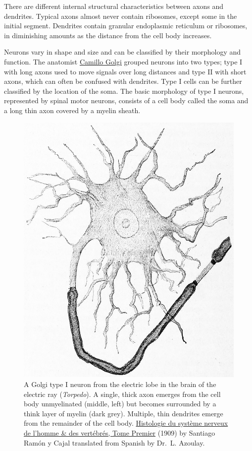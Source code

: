 There are different internal structural characteristics between axons and dendrites. Typical axons almost never contain ribosomes, except some in the initial segment. Dendrites contain granular endoplasmic reticulum or ribosomes, in diminishing amounts as the distance from the cell body increases.

Neurons vary in shape and size and can be classified by their morphology and function. The anatomist \href{https://en.wikipedia.org/wiki/Camillo_Golgi}{Camillo Golgi} grouped neurons into two types; type I with long axons used to move signals over long distances and type II with short axons, which can often be confused with dendrites. Type I cells can be further classified by the location of the soma. The basic morphology of type I neurons, represented by spinal motor neurons, consists of a cell body called the soma and a long thin axon covered by a myelin sheath.



\begin{figure}

{\centering \includegraphics[width=0.7\linewidth]{./figures/cells/CajalMyelinAxon} 

}

\caption{A Golgi type I neuron from the electric lobe in the brain of the electric ray (\emph{Torpedo}). A single, thick axon emerges from the cell body unmyelinated (middle, left) but becomes surrounded by a think layer of myelin (dark grey). Multiple, thin dendrites emerge from the remainder of the cell body. \href{https://wellcomelibrary.org/item/b2129592x\#?c=0\&m=0\&s=0\&cv=14\&z=0\%2C-3.48\%2C1\%2C8.6591}{Histologie du système nerveux de l'homme \& des vertébrés, Tome Premier} (1909) by Santiago Ramón y Cajal translated from Spanish by Dr.~L. Azoulay.}\label{fig:axonmyelinated}
\end{figure}

